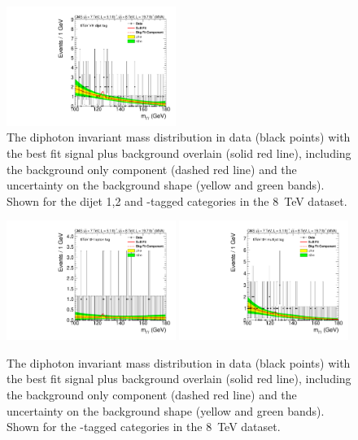 \begin{figure}
  \includegraphics[width=0.49\textwidth]{results/plots/mgg-cats/mgg_mva_nosub_ch2_cat13_8TeV.pdf}
  \caption{The diphoton invariant mass distribution in data (black points) with the best fit signal plus background overlain (solid red line), including the background only component (dashed red line) and the uncertainty on the background shape (yellow and green bands). Shown for the dijet 1,2 and \VH-tagged categories in the 8~TeV dataset.}
  \label{fig:bfres4}
\end{figure}

\begin{figure}
  \vspace{-1cm}
  \includegraphics[width=0.49\textwidth]{results/plots/mgg-cats/mgg_mva_nosub_ch2_cat11_8TeV.pdf}
  \includegraphics[width=0.49\textwidth]{results/plots/mgg-cats/mgg_mva_nosub_ch2_cat12_8TeV.pdf}
  \caption{The diphoton invariant mass distribution in data (black points) with the best fit signal plus background overlain (solid red line), including the background only component (dashed red line) and the uncertainty on the background shape (yellow and green bands). Shown for the \ttH-tagged categories in the 8~TeV dataset.}
  \label{fig:bfres5}
\end{figure}

